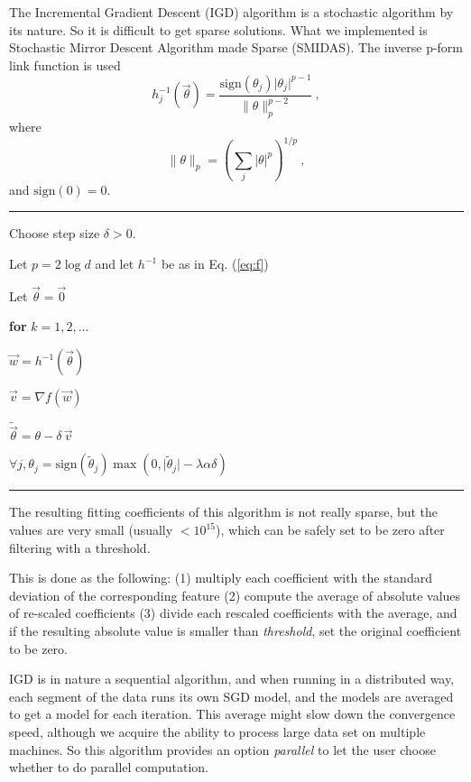 The Incremental Gradient Descent (IGD) algorithm is a stochastic
algorithm by its nature. So it is difficult to get sparse
solutions. What we implemented is Stochastic Mirror Descent Algorithm
made Sparse (SMIDAS). The inverse p-form link function is used
\begin{equation} \label{eq:f}
h_j^{-1}(\vec{\theta}) = \frac{\mbox{sign}(\theta_j)\vert \theta_j
  \vert^{p-1}}{\|\theta\|_p^{p-2}}\ ,
\end{equation}
where
\begin{equation}
\|\theta\|_p = \left(\sum_j \vert \theta \vert ^p\right)^{1/p}\ ,
\end{equation}
and $\mbox{sign}(0) = 0$.
\vspace{0.2in}
\hrule
\vspace{0.2in}
Choose step size $\delta > 0$.

Let $p = 2\log d$ and let $h^{-1}$ be as in Eq. (\ref{eq:f})

Let $\vec{\theta} = \vec{0}$

{\bf for} $k = 1,2,\dots$

\quad $\vec{w} = h^{-1}(\vec{\theta})$

\quad $\vec{v} = \nabla f(\vec{w})$

\quad $\tilde{\vec{\theta}} = \theta - \delta \, \vec{v}$

\quad $\forall j, \theta_j = \mbox{sign}(\tilde{\theta}_j)\max (0,
\vert \tilde{\theta}_j \vert- \lambda\alpha\delta)$
\vspace{0.2in}
\hrule
\vspace{0.2in}

The resulting fitting coefficients of this algorithm is not really
sparse, but the values are very small (usually $< 10^{15}$), which can
be safely set to be zero after filtering with a threshold.

This is done as the following: (1) multiply each coefficient with the
standard deviation of the corresponding feature (2) compute the
average of absolute values of re-scaled coefficients (3) divide each
rescaled coefficients with the average, and if the resulting absolute
value is smaller than \emph{threshold}, set the original coefficient
to be zero.

IGD is in nature a sequential algorithm, and when running in a
distributed way, each segment of the data runs its own SGD model, and
the models are averaged to get a model for each iteration. This
average might slow down the convergence speed, although we acquire the
ability to process large data set on multiple machines. So this
algorithm provides an option  \emph{parallel} to let the user choose
whether to do parallel computation.


